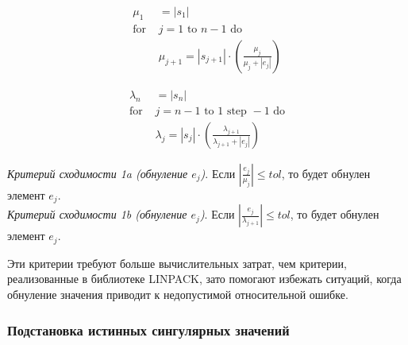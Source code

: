 \begin{minipage}{0.48\textwidth}
\begin{align*}
\mu_1& = |s_1| \\
\text{for }& j = 1 \text{ to } n-1 \text{ do} \\
&\mu_{j+1} = |s_{j+1}| \cdot \left( \frac{\mu_j}{\mu_j + |e_j|} \right)
\end{align*}
\end{minipage}
\hfill
\begin{minipage}{0.48\textwidth}
\begin{align*}
\lambda_n& = |s_n| \\
\text{for }& j = n-1 \text{ to } 1 \text{ step } -1 \text{ do} \\
&\lambda_j = |s_j| \cdot \left( \frac{\lambda_{j+1}}{\lambda_{j+1} + |e_j|} \right)
\end{align*}
\end{minipage}
\vspace{1em}

\noindent\textit{Критерий сходимости 1a (обнуление $e_j$)}. Если $|\frac{e_j}{\mu_j}|\leq tol$, то будет обнулен элемент $e_j$.\vspace{1em}
\\\textit{Критерий сходимости 1b (обнуление $e_j$)}. Если $|\frac{e_j}{\lambda_{j+1}}|\leq tol$, то будет обнулен элемент $e_j$.\vspace{1em}

Эти критерии требуют больше вычислительных затрат, чем критерии, реализованные в библиотеке LINPACK, зато помогают избежать ситуаций, когда обнуление значения приводит к недопустимой относительной ошибке.

\subsubsection{Подстановка истинных сингулярных значений}

